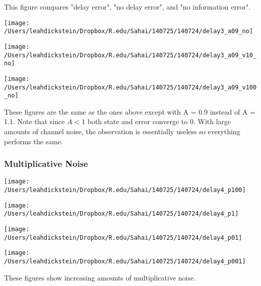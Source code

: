\documentclass[leqno,twocolumn]{article}
\begin{document}
This figure compares "delay error", "no delay error", and "no information error".

\begin{minipage}[c]{0.5\textwidth}
\texttt{[image: /Users/leahdickstein/Dropbox/R.edu/Sahai/140725/140724/delay3\_a09\_no]}
\end{minipage}
\begin{minipage}[c]{0.5\textwidth}
\texttt{[image: /Users/leahdickstein/Dropbox/R.edu/Sahai/140725/140724/delay3\_a09\_v10\_no]}
\end{minipage}

\begin{minipage}[c]{0.5\textwidth}
\texttt{[image: /Users/leahdickstein/Dropbox/R.edu/Sahai/140725/140724/delay3\_a09\_v100\_no]}
\end{minipage}
\begin{minipage}[b]{0.5\textwidth}
These figures are the same as the ones above except with A = 0.9 instead of A = 1.1. Note that since $A<1$ both state and error converge to 0. With large amounts of channel noise, the observation is essentially useless so everything performs the same.
\end{minipage}

\subsubsection{Multiplicative Noise}

\begin{minipage}[c]{0.5\textwidth}
\texttt{[image: /Users/leahdickstein/Dropbox/R.edu/Sahai/140725/140724/delay4\_p100]}
\end{minipage}
\begin{minipage}[c]{0.5\textwidth}
\texttt{[image: /Users/leahdickstein/Dropbox/R.edu/Sahai/140725/140724/delay4\_p1]}
\end{minipage}

\begin{minipage}[c]{0.5\textwidth}
\texttt{[image: /Users/leahdickstein/Dropbox/R.edu/Sahai/140725/140724/delay4\_p01]}
\end{minipage}
\begin{minipage}[c]{0.5\textwidth}
\texttt{[image: /Users/leahdickstein/Dropbox/R.edu/Sahai/140725/140724/delay4\_p001]}
\end{minipage}

These figures show increasing amounts of multiplicative noise.
\end{document}
